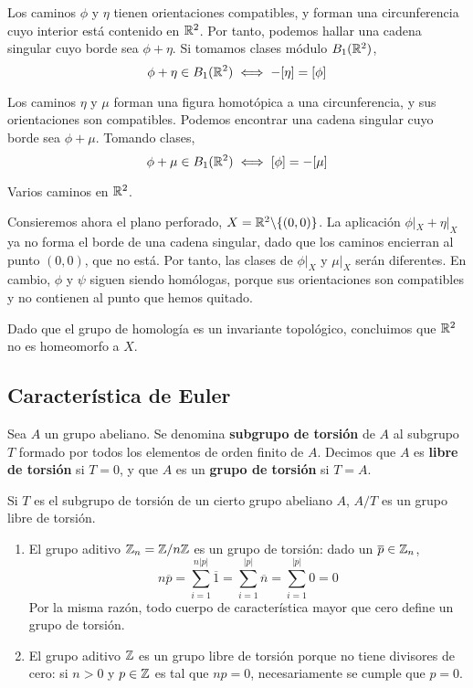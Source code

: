 Los caminos $\phi$ y $\eta$ tienen orientaciones compatibles, y forman una
circunferencia cuyo interior está contenido en $\mathbb{R}^2$. Por tanto, podemos
hallar una cadena singular cuyo borde sea $\phi+\eta$. Si tomamos clases módulo
$B_1(\mathbb{R}^2)$,
\[\phi+\eta \in B_1(\mathbb{R}^2) \iff -[\eta]=[\phi]\]

Los caminos $\eta$ y $\mu$ forman una figura homotópica a una circunferencia, y
sus orientaciones son compatibles. Podemos encontrar una cadena singular cuyo
borde sea $\phi+\mu$. Tomando clases,
\[\phi+\mu \in B_1(\mathbb{R}^2) \iff [\phi]=-[\mu]\]

\begin{marginfigure}

\caption{Varios caminos en $\mathbb{R}^2$.}
\end{marginfigure}

Consieremos ahora el plano perforado, $X=\mathbb{R}^2\backslash\{(0,0)\}$. La
aplicación $\phi|_X+\eta|_X$ ya no forma el borde de una cadena singular, dado
que los caminos encierran al punto $(0,0)$, que no está. Por tanto, las clases
de $\phi|_X$ y $\mu|_X$ serán diferentes. En cambio, $\phi$ y $\psi$ siguen
siendo homólogas, porque sus orientaciones son compatibles y no contienen al
punto que hemos quitado.

Dado que el grupo de homología es un invariante topológico, concluimos que
$\mathbb{R}^2$ no es homeomorfo a $X$.

\subsection{Característica de Euler}
\begin{definition}
Sea $A$ un grupo abeliano. Se denomina \textbf{subgrupo de torsión} de $A$ al
subgrupo $T$ formado por todos los elementos de orden finito de $A$. Decimos que
$A$ es \textbf{libre de torsión} si $T=0$, y que $A$ es un \textbf{grupo de
torsión} si $T=A$.
\end{definition}

Si $T$ es el subgrupo de torsión de un cierto grupo abeliano $A$,
$A/T$ es un grupo libre de torsión.

\begin{example}
\begin{enumerate}
\item El grupo aditivo $\mathbb{Z}_n=\mathbb{Z}/n\mathbb{Z}$ es un grupo de torsión: dado un $\overline{p} \in
\mathbb{Z}_n$,
\[n\overline{p}=\sum^{n|p|}_{i=1}\overline{1}=\sum^{|p|}_{i=1}\overline{n}=
\sum^{|p|}_{i=1}0=0\]
Por la misma razón, todo cuerpo de característica mayor que cero define un grupo de torsión.
\item El grupo aditivo $\mathbb{Z}$ es un grupo libre de torsión porque no tiene divisores de cero: si $n > 0$ y $p \in \mathbb{Z}$ es tal que $np=0$, necesariamente se cumple que $p=0$.
\end{enumerate}
\end{example}

